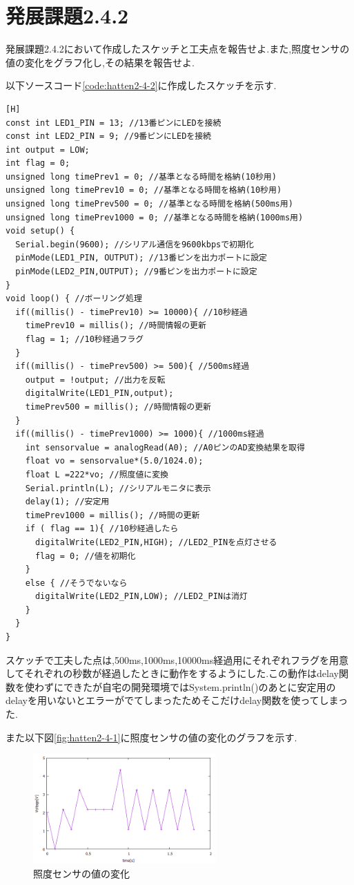 \documentclass{jarticle}
\begin{document}
\section{発展課題2.4.2}
発展課題2.4.2において作成したスケッチと工夫点を報告せよ.また,照度センサの値の変化をグラフ化し,その結果を報告せよ.

以下ソースコード\ref{code:hatten2-4-2}に作成したスケッチを示す.

\begin{lstlisting}[caption = 発展課題2.4.2,label=code:hatten2-4-2][H]
const int LED1_PIN = 13; //13番ピンにLEDを接続
const int LED2_PIN = 9; //9番ピンにLEDを接続
int output = LOW;
int flag = 0;
unsigned long timePrev1 = 0; //基準となる時間を格納(10秒用)
unsigned long timePrev10 = 0; //基準となる時間を格納(10秒用)
unsigned long timePrev500 = 0; //基準となる時間を格納(500ms用)
unsigned long timePrev1000 = 0; //基準となる時間を格納(1000ms用)
void setup() {
  Serial.begin(9600); //シリアル通信を9600kbpsで初期化
  pinMode(LED1_PIN, OUTPUT); //13番ピンを出力ポートに設定
  pinMode(LED2_PIN,OUTPUT); //9番ピンを出力ポートに設定
}
void loop() { //ボーリング処理
  if((millis() - timePrev10) >= 10000){ //10秒経過
    timePrev10 = millis(); //時間情報の更新
    flag = 1; //10秒経過フラグ
  }
  if((millis() - timePrev500) >= 500){ //500ms経過
    output = !output; //出力を反転
    digitalWrite(LED1_PIN,output);
    timePrev500 = millis(); //時間情報の更新
  }
  if((millis() - timePrev1000) >= 1000){ //1000ms経過
    int sensorvalue = analogRead(A0); //A0ピンのAD変換結果を取得
    float vo = sensorvalue*(5.0/1024.0);
    float L =222*vo; //照度値に変換
    Serial.println(L); //シリアルモニタに表示
    delay(1); //安定用
    timePrev1000 = millis(); //時間の更新
    if ( flag == 1){ //10秒経過したら
      digitalWrite(LED2_PIN,HIGH); //LED2_PINを点灯させる
      flag = 0; //値を初期化
    }
    else { //そうでないなら
      digitalWrite(LED2_PIN,LOW); //LED2_PINは消灯
    }
  }
}
\end{lstlisting}

スケッチで工夫した点は,500ms,1000ms,10000ms経過用にそれぞれフラグを用意してそれぞれの秒数が経過したときに動作をするようにした.この動作はdelay関数を使わずにできたが自宅の開発環境ではSystem.println()のあとに安定用のdelayを用いないとエラーがでてしまったためそこだけdelay関数を使ってしまった.

また以下図\ref{fig:hatten2-4-1}に照度センサの値の変化のグラフを示す.

\begin{figure}[H]
\begin{center}
\includegraphics[width=7.0cm]{images/hatten2-4-2.png}
\caption{照度センサの値の変化}
\label{fig:hatten2-4-2}
\end{center}
\end{figure}
\end{document}
